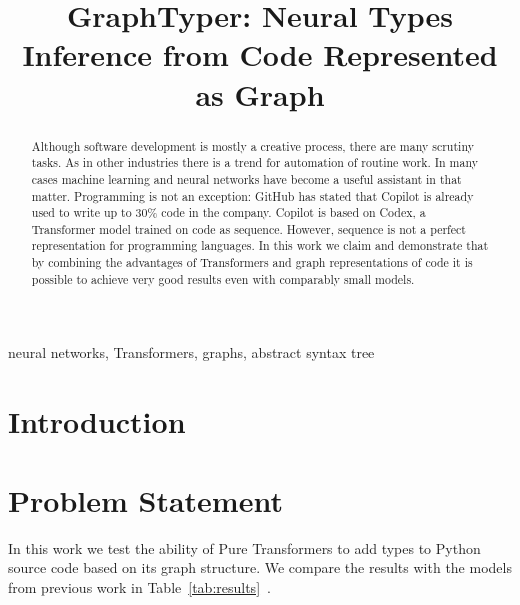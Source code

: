 \documentclass[conference]{IEEEtran}
\begin{document}
\author{
     \and
    \and
}

\title{GraphTyper: Neural Types Inference from Code Represented as Graph}

\begin{abstract}
    Although software development is mostly a creative process, there are many scrutiny tasks.
    As in other industries there is a trend for automation of routine work.
    In many cases machine learning and neural networks have become a useful assistant in that matter.
    Programming is not an exception: GitHub has stated that Copilot is already used to write up to 30\% code in the company.
    Copilot is based on Codex, a Transformer model trained on code as sequence.
    However, sequence is not a perfect representation for programming languages.
    In this work we claim and demonstrate that by combining the advantages of Transformers
    and graph representations of code it is possible to achieve very good results even with comparably small models.
\end{abstract}

\begin{IEEEkeywords}
    neural networks, Transformers, graphs, abstract syntax tree
\end{IEEEkeywords}

\maketitle

\section{Introduction}\label{sec:introduction}


\section{Problem Statement}\label{sec:problem-statement}

In this work we test the ability of Pure Transformers to add types to Python source code based on its graph structure.
We compare the results with the models from previous work in Table~\ref{tab:results}~\cite{allamanis2020typilus}.
\end{document}
